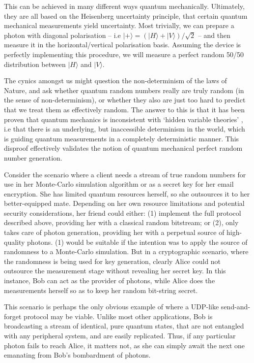 \documentclass[aps,rmp,twocolumn,amsmath,amssymb,nofootinbib,superscriptaddress,longbibliography,floatfix]{revtex4-1}
\newcommand{\ket}[1]{|#1\rangle}
\begin{document}
This can be achieved in many different ways quantum mechanically. Ultimately, they are all based on the Heisenberg uncertainty principle, that certain quantum mechanical measurements yield uncertainty. Most trivially, we can prepare a photon with diagonal polarisation -- i.e \mbox{$\ket{+} = (\ket{H}+\ket{V})/\sqrt{2}$} -- and then measure it in the horizontal/vertical polarisation basis. Assuming the device is perfectly implementing this procedure, we will measure a perfect random 50/50 distribution between $\ket{H}$ and $\ket{V}$.

The cynics amongst us might question the non-determinism of the laws of Nature, and ask whether quantum random numbers really are truly random (in the sense of non-determinism), or whether they also are just too hard to predict that we treat them as effectively random. The answer to this is that it has been proven that quantum mechanics is inconsistent with `hidden variable theories' \cite{Bell}, i.e that there is an underlying, but inaccessible determinism in the world, which is guiding quantum measurements in a completely deterministic manner. This disproof effectively validates the notion of quantum mechanical perfect random number generation.

Consider the scenario where a client needs a stream of true random numbers for use in her Monte-Carlo simulation algorithm or as a secret key for her email encryption. She has limited quantum resources herself, so she outsources it to her better-equipped mate. Depending on her own resource limitations and potential security considerations, her friend could either: (1) implement the full protocol described above, providing her with a classical random bitstream; or (2), only takes care of photon generation, providing her with a perpetual source of high-quality photons. (1) would be suitable if the intention was to apply the source of randomness to a Monte-Carlo simulation. But in a cryptographic scenario, where the randomness is being used for key generation, clearly Alice could not outsource the measurement stage without revealing her secret key. In this instance, Bob can act as the provider of photons, while Alice does the measurements herself so as to keep her random bit-string secret.

This scenario is perhaps the only obvious example of where a UDP-like send-and-forget protocol may be viable. Unlike most other applications, Bob is broadcasting a stream of identical, pure quantum states, that are not entangled with any peripheral system, and are easily replicated. Thus, if any particular photon fails to reach Alice, it matters not, as she can simply await the next one emanating from Bob's bombardment of photons.
\end{document}
